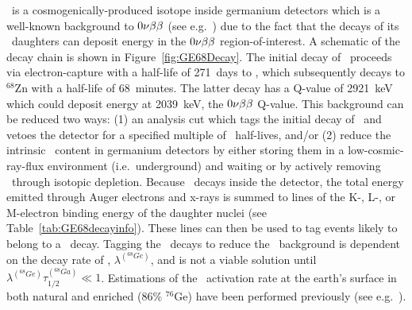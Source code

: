        \gersixeight~is a cosmogenically-produced isotope inside germanium detectors which is a well-known background to $0 \nu \beta \beta$ (see e.g.~\cite{Ceb06aa}) due to the fact that the decays of its \galsixeight~daughters can deposit energy in the $0 \nu \beta \beta$ region-of-interest.  A schematic of the decay chain is shown in Figure~\ref{fig:GE68Decay}.  The initial decay of \gersixeight~proceeds via electron-capture with a half-life of 271~days to \galsixeight, which subsequently decays to $^{68}$Zn with a half-life of 68~minutes.  The latter decay has a Q-value of 2921~keV which could deposit energy at 2039~keV, the $0 \nu \beta \beta$ Q-value.  This background can be reduced two ways: (1) an analysis cut which tags the initial decay of \gersixeight~and vetoes the detector for a specified multiple of \galsixeight~half-lives, and/or (2) reduce the intrinsic \gersixeight~content in germanium detectors by either storing them in a low-cosmic-ray-flux environment (i.e.~underground) and waiting or by actively removing \gersixeight~through isotopic depletion.  Because \gersixeight~decays inside the detector, the total energy emitted through Auger electrons and x-rays is summed to lines of the K-, L-, or M-electron binding energy of the daughter nuclei (see Table~\ref{tab:GE68decayinfo}).  These lines can then be used to tag events likely to belong to a \gersixeight~decay.  Tagging the \gersixeight~decays to reduce the \galsixeight~background is dependent on the decay rate of \gersixeight, $\lambda^{(^{68}Ge)}$, and is not a viable solution until $\lambda^{(^{68}Ge)} \tau_{1/2}^{(^{68}Ga)} \ll 1$.   Estimations of the \gersixeight~activation rate at the earth's surface in both natural and enriched (86\% $^{76}$Ge) have been performed previously (see e.g.~\cite{Avi92,Elliott:2009cw}).  

